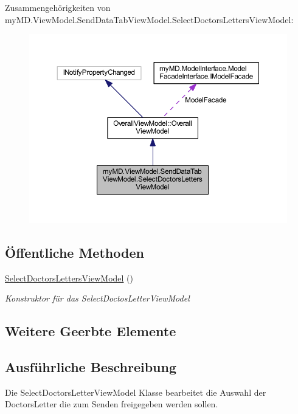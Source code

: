 Zusammengehörigkeiten von my\+M\+D.\+View\+Model.\+Send\+Data\+Tab\+View\+Model.\+Select\+Doctors\+Letters\+View\+Model\+:
\nopagebreak
\begin{figure}[H]
\begin{center}
\leavevmode
\includegraphics[width=350pt]{classmy_m_d_1_1_view_model_1_1_send_data_tab_view_model_1_1_select_doctors_letters_view_model__coll__graph}
\end{center}
\end{figure}
\subsection*{Öffentliche Methoden}
\begin{DoxyCompactItemize}
\item 
\mbox{\hyperlink{classmy_m_d_1_1_view_model_1_1_send_data_tab_view_model_1_1_select_doctors_letters_view_model_a87c5e4323853a8ec4a634b011d26ae97}{Select\+Doctors\+Letters\+View\+Model}} ()
\begin{DoxyCompactList}\small\item\em Konstruktor für das Select\+Doctos\+Letter\+View\+Model \end{DoxyCompactList}\end{DoxyCompactItemize}
\subsection*{Weitere Geerbte Elemente}


\subsection{Ausführliche Beschreibung}
Die Select\+Doctors\+Letter\+View\+Model Klasse bearbeitet die Auswahl der Doctors\+Letter die zum Senden freigegeben werden sollen. 



